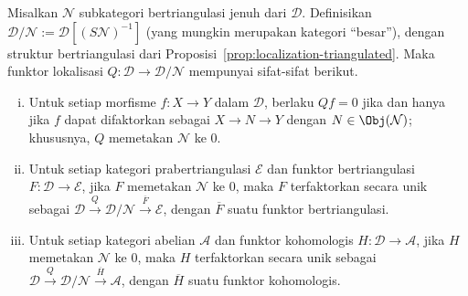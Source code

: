 \begin{teorema}\label{prop:Verdier-localization}
	Misalkan $\mathcal{N}$ subkategori bertriangulasi jenuh dari
	$\mathcal{D}$. Definisikan
	$\mathcal{D}/\mathcal{N} := \mathcal{D}\left[ (S\mathcal{N})^{-1}\right]$
	(yang mungkin merupakan kategori ``besar''), dengan struktur bertriangulasi
	dari Proposisi~\ref{prop:localization-triangulated}. Maka funktor lokalisasi
	$Q: \mathcal{D} \to \mathcal{D}/\mathcal{N}$ mempunyai sifat-sifat berikut.
	\begin{enumerate}[(i)]
		\item Untuk setiap morfisme $f: X \to Y$ dalam $\mathcal{D}$, berlaku
		$Qf = 0$ jika dan hanya jika $f$ dapat difaktorkan sebagai
		$X \to N \to Y$ dengan $N \in \Obj(\mathcal{N})$; khususnya, $Q$
		memetakan $\mathcal{N}$ ke $0$.
		\item Untuk setiap kategori prabertriangulasi $\mathcal{E}$ dan funktor
		bertriangulasi $F: \mathcal{D} \to \mathcal{E}$, jika $F$ memetakan
		$\mathcal{N}$ ke $0$, maka $F$ terfaktorkan secara unik sebagai
		$\mathcal{D} \xrightarrow{Q} \mathcal{D}/\mathcal{N}
		\xrightarrow{\overline{F}} \mathcal{E}$, dengan $\overline{F}$ suatu
		funktor bertriangulasi.
		\item Untuk setiap kategori abelian $\mathcal{A}$ dan funktor kohomologis
		$H: \mathcal{D} \to \mathcal{A}$, jika $H$ memetakan $\mathcal{N}$ ke
		$0$, maka $H$ terfaktorkan secara unik sebagai
		$\mathcal{D} \xrightarrow{Q} \mathcal{D}/\mathcal{N}
		\xrightarrow{\overline{H}} \mathcal{A}$, dengan $\overline{H}$ suatu
		funktor kohomologis.
	\end{enumerate}
\end{teorema}

